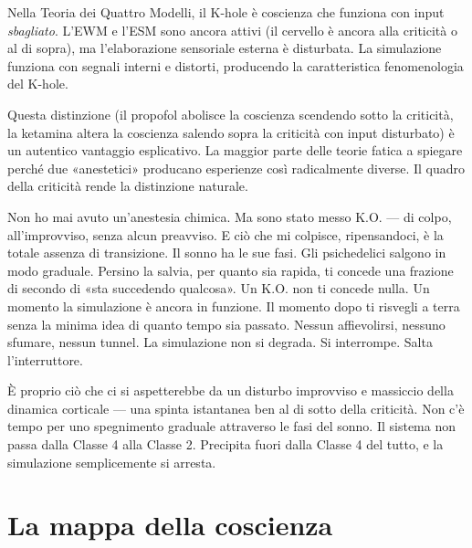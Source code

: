 \documentclass[11pt, twoside, openright]{book}
\begin{document}
Nella Teoria dei Quattro Modelli, il K-hole è coscienza che funziona con input \textit{sbagliato}. L'EWM e l'ESM sono ancora attivi (il cervello è ancora alla criticità o al di sopra), ma l'elaborazione sensoriale esterna è disturbata. La simulazione funziona con segnali interni e distorti, producendo la caratteristica fenomenologia del K-hole.

Questa distinzione (il propofol abolisce la coscienza scendendo sotto la criticità, la ketamina altera la coscienza salendo sopra la criticità con input disturbato) è un autentico vantaggio esplicativo. La maggior parte delle teorie fatica a spiegare perché due «anestetici» producano esperienze così radicalmente diverse. Il quadro della criticità rende la distinzione naturale.

Non ho mai avuto un'anestesia chimica. Ma sono stato messo K.O. --- di colpo, all'improvviso, senza alcun preavviso. E ciò che mi colpisce, ripensandoci, è la totale assenza di transizione. Il sonno ha le sue fasi. Gli psichedelici salgono in modo graduale. Persino la salvia, per quanto sia rapida, ti concede una frazione di secondo di «sta succedendo qualcosa». Un K.O. non ti concede nulla. Un momento la simulazione è ancora in funzione. Il momento dopo ti risvegli a terra senza la minima idea di quanto tempo sia passato. Nessun affievolirsi, nessuno sfumare, nessun tunnel. La simulazione non si degrada. Si interrompe. Salta l'interruttore.

È proprio ciò che ci si aspetterebbe da un disturbo improvviso e massiccio della dinamica corticale --- una spinta istantanea ben al di sotto della criticità. Non c'è tempo per uno spegnimento graduale attraverso le fasi del sonno. Il sistema non passa dalla Classe 4 alla Classe 2. Precipita fuori dalla Classe 4 del tutto, e la simulazione semplicemente si arresta.

\section*{La mappa della coscienza}
\end{document}
